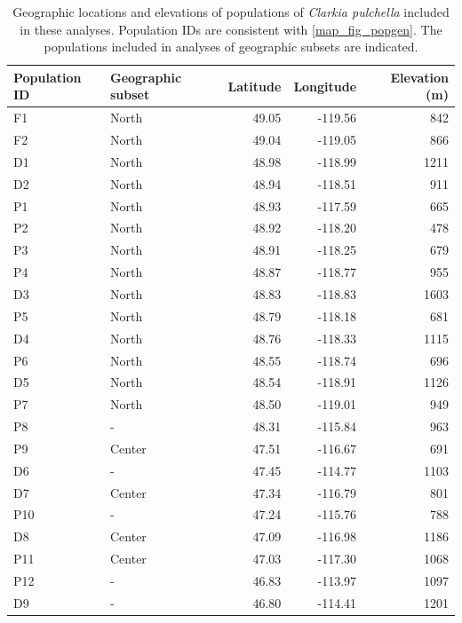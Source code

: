\documentclass{article}
\newcommand{\beginsupplement}{%
        \setcounter{table}{0}
        \renewcommand{\thetable}{S\arabic{table}}%
        \setcounter{figure}{0}
        \renewcommand{\thefigure}{S\arabic{figure}}%
     }
\begin{document}
\clearpage


\beginsupplement

\begin{table}[p]
\centering
\caption[Geographic information for populations included in population genetic analyses]{Geographic locations and elevations of populations of \textit{Clarkia pulchella} included in these analyses. Population IDs are consistent with \autoref{map_fig_popgen}. The populations included in analyses of geographic subsets are indicated.}
\label{pops_tab}
\begin{tabular}{llrrr}
\toprule
Population ID	& Geographic subset &	Latitude & Longitude & Elevation (m) \\
\midrule
F1  & North   &	49.05 &	-119.56 &	842  \\
F2  &	North   &	49.04 &	-119.05 &	866  \\
D1  &	North   &	48.98 &	-118.99 &	1211 \\
D2  &	North   &	48.94 &	-118.51 &	911  \\
P1  &	North   &	48.93 &	-117.59 &	665  \\
P2  &	North   &	48.92 &	-118.20 &	478  \\
P3  &	North   &	48.91 &	-118.25 &	679  \\
P4  &	North   &	48.87 &	-118.77 &	955  \\
D3  &	North   &	48.83 &	-118.83 &	1603 \\
P5  &	North   &	48.79 &	-118.18 &	681  \\
D4  &	North   &	48.76 &	-118.33 &	1115 \\
P6  &	North   &	48.55 &	-118.74 &	696  \\
D5  &	North   &	48.54 &	-118.91 &	1126 \\
P7  &	North   &	48.50 &	-119.01 &	949  \\
P8  &	-       &	48.31 &	-115.84 &	963  \\
P9  &	Center  &	47.51 &	-116.67 &	691  \\
D6  &	-	      & 47.45 &	-114.77 &	1103 \\
D7  &	Center  &	47.34 &	-116.79 &	801  \\
P10 &	-	      & 47.24 &	-115.76 &	788  \\
D8  &	Center	& 47.09 &	-116.98 &	1186 \\
P11 &	Center	& 47.03 &	-117.30 &	1068 \\
P12 &	-       &	46.83 &	-113.97 &	1097 \\
D9  &	-       &	46.80 &	-114.41 &	1201 \\

\end{tabular}
\end{table}
\end{document}
